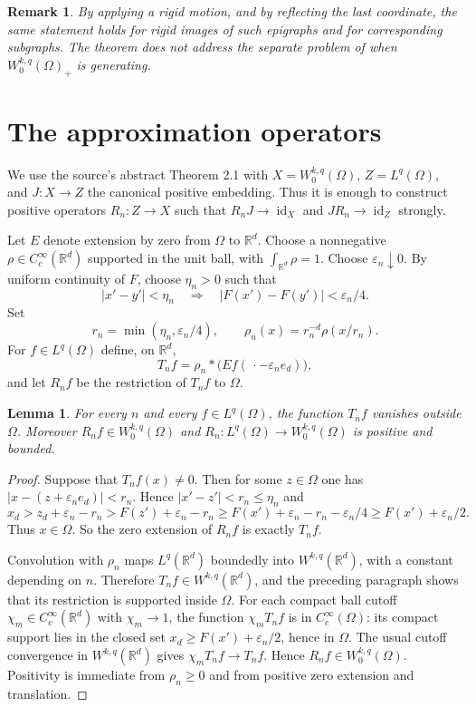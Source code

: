 \documentclass[11pt]{amsart}
\newtheorem{lemma}{Lemma}
\newtheorem{remark}{Remark}
\newcommand{\R}{\mathbb R}
\newcommand{\id}{\operatorname{id}}
\begin{document}
\begin{remark}
By applying a rigid motion, and by reflecting the last coordinate, the same
statement holds for rigid images of such epigraphs and for corresponding
subgraphs.  The theorem does not address the separate problem of when
$W^{k,q}_0(\Omega)_+$ is generating.
\end{remark}

\section*{The approximation operators}

We use the source's abstract Theorem 2.1 with
$X=W^{k,q}_0(\Omega)$, $Z=L^q(\Omega)$, and $J:X\to Z$ the canonical positive
embedding.  Thus it is enough to construct positive operators
$R_n:Z\to X$ such that $R_nJ\to\id_X$ and $JR_n\to\id_Z$ strongly.

Let $E$ denote extension by zero from $\Omega$ to $\R^d$.  Choose a nonnegative
$\rho\in C_c^\infty(\R^d)$ supported in the unit ball, with
$\int_{\R^d}\rho=1$.  Choose $\varepsilon_n\downarrow 0$.  By uniform
continuity of $F$, choose $\eta_n>0$ such that
\[
 |x'-y'|<\eta_n\quad\Longrightarrow\quad
 |F(x')-F(y')|<\varepsilon_n/4.
\]
Set
\[
 r_n=\min(\eta_n,\varepsilon_n/4),
 \qquad
 \rho_n(x)=r_n^{-d}\rho(x/r_n).
\]
For $f\in L^q(\Omega)$ define, on $\R^d$,
\[
 T_n f=\rho_n * \bigl(Ef(\,\cdot-\varepsilon_n e_d)\bigr),
\]
and let $R_nf$ be the restriction of $T_nf$ to $\Omega$.

\begin{lemma}
\label{lem:inside}
For every $n$ and every $f\in L^q(\Omega)$, the function $T_nf$ vanishes
outside $\Omega$.  Moreover $R_nf\in W^{k,q}_0(\Omega)$ and
$R_n:L^q(\Omega)\to W^{k,q}_0(\Omega)$ is positive and bounded.
\end{lemma}

\begin{proof}
Suppose that $T_nf(x)\ne0$.  Then for some $z\in\Omega$ one has
$|x-(z+\varepsilon_ne_d)|<r_n$.  Hence $|x'-z'|<r_n\leq\eta_n$ and
\[
 x_d>z_d+\varepsilon_n-r_n
    >F(z')+\varepsilon_n-r_n
    \geq F(x')+\varepsilon_n-r_n-\varepsilon_n/4
    \geq F(x')+\varepsilon_n/2.
\]
Thus $x\in\Omega$.  So the zero extension of $R_nf$ is exactly $T_nf$.

Convolution with $\rho_n$ maps $L^q(\R^d)$ boundedly into $W^{k,q}(\R^d)$, with
a constant depending on $n$.  Therefore $T_nf\in W^{k,q}(\R^d)$, and the
preceding paragraph shows that its restriction is supported inside $\Omega$.
For each compact ball cutoff $\chi_m\in C_c^\infty(\R^d)$ with
$\chi_m\to1$, the function $\chi_mT_nf$ is in $C_c^\infty(\Omega)$: its compact
support lies in the closed set $x_d\geq F(x')+\varepsilon_n/2$, hence in
$\Omega$.  The usual cutoff convergence in $W^{k,q}(\R^d)$ gives
$\chi_mT_nf\to T_nf$.  Hence $R_nf\in W^{k,q}_0(\Omega)$.  Positivity is
immediate from $\rho_n\geq0$ and from positive zero extension and translation.
\end{proof}
\end{document}
